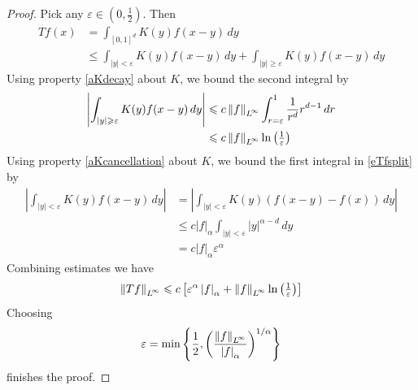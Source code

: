 \documentclass[final]{amsart}%
\renewcommand{\epsilon}{\varepsilon}
\renewcommand{\leq}{\leqslant}
\renewcommand{\geq}{\geqslant}
\newif\iftextstyle
\newcommand{\abs}[1]{\iftextstyle\lvert#1\rvert\else\left\lvert#1\right\rvert\fi}
\newcommand{\norm}[1]{\iftextstyle\lVert#1\rVert\else\left\lVert#1\right\rVert\fi}
\newcommand{\holdersnorm}[2]{\abs{#1}_{#2}}
\newcommand{\lpnorm}[2]{\norm{#1}_{\smash{L^{\!#2}_{\vphantom{h}}}\vphantom{L^{\!#2}}}}
\newcommand{\linfnorm}[1]{\lpnorm{#1}{\infty}}
\numberwithin{equation}{section}
\theoremstyle{definition}
\theoremstyle{remark}
\begin{document}
\begin{proof}
Pick any $\epsilon \in (0,\frac{1}{2})$. Then
\begin{align}
\nonumber Tf(x) &= \int_{[0,1]^d} K(y) f(x-y) \, dy\\
\label{eTfsplit}   &\leq \int_{\abs y < \epsilon} K(y) f(x-y) \, dy + \int_{\abs y \geq \epsilon} K(y) f(x-y) \, dy
\end{align}
Using property \ref{aKdecay} about $K$, we bound the second integral
by
\begin{align*}
  \abs{\int_{\abs y \geq \epsilon} K(y) f(x-y) \, dy} &\leq c \linfnorm{f} \int_{r=\epsilon}^1 \frac{1}{r^d} r^{d-1} \, dr\\
  &\leq c \linfnorm{f} \ln \left( \tfrac{1}{\epsilon} \right)
\end{align*}
Using property \ref{aKcancellation} about $K$, we bound the first integral in \eqref{eTfsplit} by
\begin{align*}
  \abs{\int_{\abs y < \epsilon} K(y) f(x-y) \, dy} & = \abs{\int_{\abs y < \epsilon} K(y) (f(x-y) - f(x)) \, dy}\\
  &\leq c \holdersnorm{f}{\alpha} \int_{\abs y < \epsilon} \abs{y}^{\alpha - d} \, dy\\
  &= c \holdersnorm{f}{\alpha} \epsilon^\alpha
\end{align*}
Combining estimates we have
$$
\linfnorm{Tf} \leq c\left[ \epsilon^\alpha \holdersnorm{f}{\alpha} +
  \linfnorm{f} \ln \left( \tfrac{1}{\epsilon} \right) \right]
$$
Choosing
$$
\epsilon = \min\left\{ \frac{1}{2},
  \left(\frac{\linfnorm{f}}{\holdersnorm{f}{\alpha}}\right)^{1/\alpha}
\right\}
$$
finishes the proof.
\end{proof}%
\end{document}
